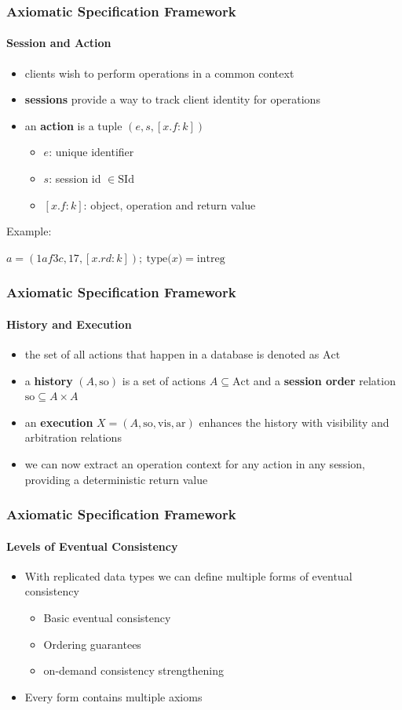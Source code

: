 \documentclass[11pt]{beamer}
\begin{document}
\begin{frame}
\frametitle{Axiomatic Specification Framework}
\framesubtitle{Session and Action}
\begin{itemize}
\item clients wish to perform operations in a common context
\item \textbf{sessions} provide a way to track client identity for operations
\item an \textbf{action} is a tuple \((e,s,[x.f:k])\)
\begin{itemize}
\item \(e\): unique identifier
\item \(s\): session id \(\in \mathrm{SId}\)
\item \([x.f:k]\): object, operation and return value
\end{itemize}
\end{itemize}
\pause
Example:

\begin{center}
\(a = (1af3c, 17, [x.rd: k]);\ \mathrm{type(}x\mathrm{)} = \mathrm{intreg}\)
\end{center}
\end{frame}

\begin{frame}
\frametitle{Axiomatic Specification Framework}
\framesubtitle{History and Execution}
\begin{itemize}
\item the set of all actions that happen in a database is denoted as \(\mathrm{Act}\)
\item a \textbf{history} \((A,\mathrm{so})\) is a set of actions \(A \subseteq \mathrm{Act}\) and a \textbf{session order} relation \(\mathrm{so} \subseteq A \times A \)
\item an \textbf{execution} \(X = (A, \mathrm{so, vis, ar})\) enhances the history with visibility and arbitration relations
\item we can now extract an operation context for any action in any session, providing a deterministic return value
\end{itemize}

\end{frame}

\begin{frame}
\frametitle{Axiomatic Specification Framework}
\framesubtitle{Levels of Eventual Consistency}
\begin{itemize}
\item With replicated data types we can define multiple forms of eventual consistency
\begin{itemize}
\item Basic eventual consistency
\item Ordering guarantees
\item on-demand consistency strengthening
\end{itemize}
\item Every form contains multiple axioms
\end{itemize}
\end{frame}
\end{document}
